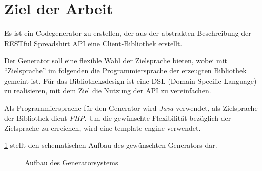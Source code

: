 \section{Ziel der Arbeit}

Es ist ein Codegenerator zu erstellen, der aus der abstrakten Beschreibung der \gls{RESTful} Spreadshirt \gls{API} eine Client-Bibliothek erstellt. 

Der Generator soll eine flexible Wahl der Zielsprache bieten, wobei mit \enquote{Zielsprache} im folgenden die Programmiersprache der erzeugten Bibliothek gemeint ist. 
Für das Bibliotheksdesign ist eine \gls{DSL} (Domain-Specific Language) zu realisieren, mit dem Ziel die Nutzung der \gls{API} zu vereinfachen. 

Als Programmiersprache für den Generator wird \emph{Java} verwendet, als Zielsprache der Bibliothek dient \emph{PHP}. Um die gewünschte Flexibilität bezüglich der Zielsprache zu erreichen, wird eine \gls{template-engine} verwendet.

\cref{fig:generatorstructure} stellt den schematischen Aufbau des gewünschten Generators dar.

\begin{figure}[tb]
    \centering
    \resizebox{\textwidth}{!}{
        
    }
    \caption{Aufbau des Generatorsystems}
    \label{fig:generatorstructure}
\end{figure}        